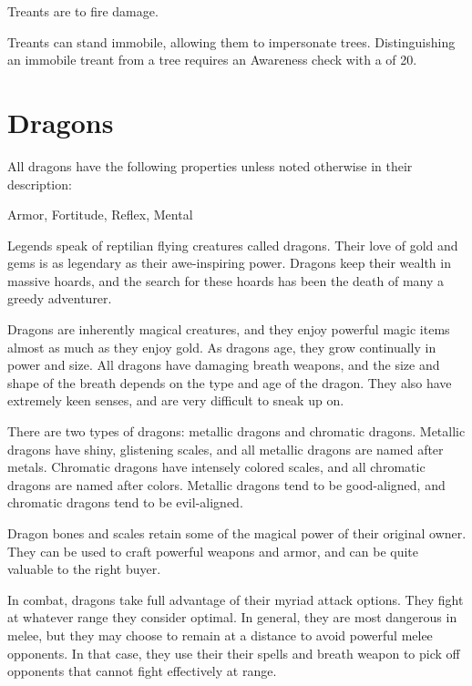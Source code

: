         Treants are  to fire damage.
      
        Treants can stand immobile, allowing them to impersonate trees.
        Distinguishing an immobile treant from a tree requires an Awareness check with a  of 20.
  
  
        \newpage
        \section{Dragons}

        All dragons have the following properties unless noted otherwise in their description:
        
    
     Armor,
     Fortitude,
     Reflex,
     Mental
  
      Legends speak of reptilian flying creatures called dragons.
      Their love of gold and gems is as legendary as their awe-inspiring power.
      Dragons keep their wealth in massive hoards, and the search for these hoards has been the death of many a greedy adventurer.

      Dragons are inherently magical creatures, and they enjoy powerful magic items almost as much as they enjoy gold.
      As dragons age, they grow continually in power and size.
      All dragons have damaging breath weapons, and the size and shape of the breath depends on the type and age of the dragon.
      They also have extremely keen senses, and are very difficult to sneak up on.

      There are two types of dragons: metallic dragons and chromatic dragons.
      Metallic dragons have shiny, glistening scales, and all metallic dragons are named after metals.
      Chromatic dragons have intensely colored scales, and all chromatic dragons are named after colors.
      Metallic dragons tend to be good-aligned, and chromatic dragons tend to be evil-aligned.

      Dragon bones and scales retain some of the magical power of their original owner.
      They can be used to craft powerful weapons and armor, and can be quite valuable to the right buyer.

      In combat, dragons take full advantage of their myriad attack options.
      They fight at whatever range they consider optimal.
      In general, they are most dangerous in melee, but they may choose to remain at a distance to avoid powerful melee opponents.
      In that case, they use their their spells and breath weapon to pick off opponents that cannot fight effectively at range.

